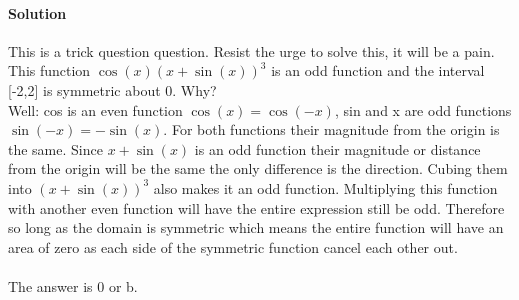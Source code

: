 \documentclass[MATH-115-Notes.tex]{subfiles}
\begin{document}
\begin{enumerate}[itemsep=5mm]
        \paragraph*{Solution}
        This is a trick question question. Resist the urge to solve this, it will be a pain. This function $ \cos(x) (x + \sin(x))^3 $ is an odd function and the interval [-2,2] is symmetric about 0. Why?\\
        Well: cos is an even function $\cos(x) = \cos(-x)$, sin and x are odd functions $\sin(-x) = -\sin(x)$. For both functions their magnitude from the origin is the same. Since $x + \sin(x)$ is an odd function their magnitude or distance from the origin will be the same the only difference is the direction. Cubing them into $ (x + \sin(x))^3 $ also makes it an odd function. Multiplying this function with another even function will have the entire expression still be odd. Therefore so long as the domain is symmetric which means the entire function will have an area of zero as each side of the symmetric function cancel each other out. 
        \\~\\
        The answer is 0 or b.\\  
        

\end{enumerate}
\end{document}
